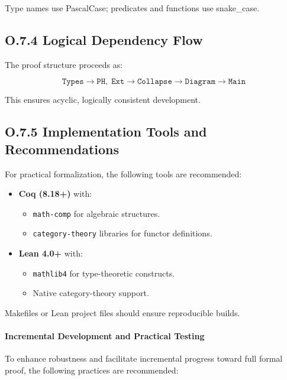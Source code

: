 \documentclass[11pt]{article}
\begin{document}
Type names use PascalCase; predicates and functions use snake\_case.


\subsection*{O.7.4 Logical Dependency Flow}

The proof structure proceeds as:

\[
\boxed{\texttt{Types} \longrightarrow \texttt{PH},\; \texttt{Ext} \longrightarrow \texttt{Collapse} \longrightarrow \texttt{Diagram} \longrightarrow \texttt{Main}}
\]

This ensures acyclic, logically consistent development.

\subsection*{O.7.5 Implementation Tools and Recommendations}

For practical formalization, the following tools are recommended:

\begin{itemize}
  \item \textbf{Coq (8.18+)} with:
  \begin{itemize}
    \item \texttt{math-comp} for algebraic structures.
    \item \texttt{category-theory} libraries for functor definitions.
  \end{itemize}
  \item \textbf{Lean 4.0+} with:
  \begin{itemize}
    \item \texttt{mathlib4} for type-theoretic constructs.
    \item Native category-theory support.
  \end{itemize}
\end{itemize}

Makefiles or Lean project files should ensure reproducible builds.

\paragraph{Incremental Development and Practical Testing}

To enhance robustness and facilitate incremental progress toward full formal proof, the following practices are recommended:
\end{document}
